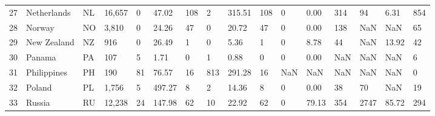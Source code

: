 \begin{tabular}{llllllllllllllll}
27 &         Netherlands &        NL  &               16,657 &               0 &                    47.02 &                       108 &               2 &                   315.51 &                       108 &               0 &                     0.00 &                       314 &                  94 &                     6.31 &                       854 \\
28 &              Norway &        NO  &                3,810 &               0 &                    24.26 &                        47 &               0 &                    20.72 &                        47 &               0 &                     0.00 &                       138 &                 NaN &                      NaN &                        65 \\
29 &         New Zealand &        NZ  &                  916 &               0 &                    26.49 &                         1 &               0 &                     5.36 &                         1 &               0 &                     8.78 &                        44 &                 NaN &                    13.92 &                        42 \\
30 &              Panama &        PA  &                  107 &               5 &                     1.71 &                         0 &               1 &                     0.88 &                         0 &               0 &                     0.00 &                       NaN &                 NaN &                      NaN &                         6 \\
31 &         Philippines &         PH &                  190 &              81 &                    76.57 &                        16 &             813 &                   291.28 &                        16 &             NaN &                      NaN &                       NaN &                 NaN &                      NaN &                         0 \\
32 &              Poland &        PL  &                1,756 &               5 &                   497.27 &                         8 &               2 &                    14.36 &                         8 &               0 &                     0.00 &                        38 &                  70 &                      NaN &                        19 \\
33 &              Russia &        RU  &               12,238 &              24 &                   147.98 &                        62 &              10 &                    22.92 &                        62 &               0 &                    79.13 &                       354 &                2747 &                    85.72 &                       294 \\

\end{tabular}
